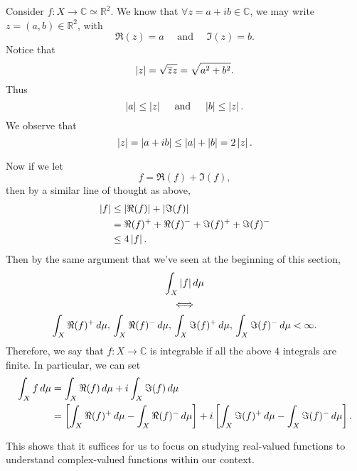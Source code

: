 \documentclass[notoc,notitlepage]{tufte-book}
\begin{document}
\begin{remark}
  Consider $f : X \to \mathbb{C} \simeq \mathbb{R}^2$.
  We know that $\forall z = a + ib \in \mathbb{C}$,
  we may write $z = (a, b) \in \mathbb{R}^2$,
  with
  \begin{equation*}
    \Re(z) = a \quad \text{ and } \quad \Im(z) = b.
  \end{equation*}
  Notice that
  \begin{equation*}
    \left|z\right| = \sqrt{\overline{z} z} = \sqrt{a^2 + b^2}.
  \end{equation*}
  Thus
  \begin{equation*}
    \left|a\right| \leq \left|z\right| \quad \text{ and } \quad \left|b\right| \leq \left|z\right|.
  \end{equation*}
  We observe that
  \begin{equation*}
    \left|z\right| = \left|a + ib\right| \leq \left|a\right| + \left|b\right| = 2 \left|z\right|.
  \end{equation*}

  Now if we let
  \begin{equation*}
    f = \Re(f) + \Im(f),
  \end{equation*}
  then by a similar line of thought as above,
  \begin{align*}
    \left|f\right| &\leq \left|\Re(f)\right| + \left|\Im(f)\right| \\
            &= \Re(f)^+ + \Re(f)^- + \Im(f)^+ + \Im(f)^- \\
            &\leq 4 \left|f\right|.
  \end{align*}
  Then by the same argument that we've seen at the beginning of this section,
  \begin{gather*}
    \int_{X} \left|f\right| \mathop{}\!d{\mu} \\
    \iff \\
    \int_{X} \Re(f)^+ \mathop{}\!d{\mu},\, \int_{X} \Re(f)^- \mathop{}\!d{\mu},\,
    \int_{X} \Im(f)^+ \mathop{}\!d{\mu},\, \int_{X} \Im(f)^- \mathop{}\!d{\mu} < \infty.
  \end{gather*}
  Therefore, we say that $f : X \to \mathbb{C}$ is integrable if
  all the above $4$ integrals are finite.
  In particular, we can set
  \begin{align*}
    \int_{X} f \mathop{}\!d{\mu}
    &= \int_{X} \Re(f) \mathop{}\!d{\mu} + i \int_{X} \Im(f) \mathop{}\!d{\mu} \\
    &= \left[ \int_{X} \Re(f)^+ \mathop{}\!d{\mu} - \int_{X} \Re(f)^- \mathop{}\!d{\mu} \right]
      + i \left[ \int_{X} \Im(f)^+ \mathop{}\!d{\mu} - \int_{X} \Im(f)^- \mathop{}\!d{\mu} \right].
  \end{align*}

  This shows that it suffices for us to focus on studying
  real-valued functions to understand complex-valued functions
  within our context.
\end{remark}
\end{document}
